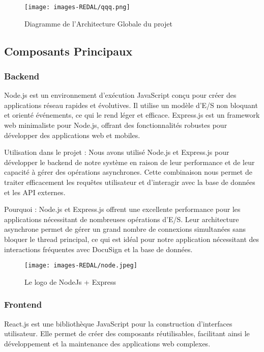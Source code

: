 \begin{figure}[H]
\begin{center}
\texttt{[image: images-REDAL/qqq.png]}
\end{center}
\caption{Diagramme de l'Architecture Globale du projet}
\end{figure}

\newpage
\subsection{Composants Principaux}
\subsubsection{Backend}
Node.js est un environnement d'exécution JavaScript conçu pour créer des applications réseau rapides et évolutives. Il utilise un modèle d'E/S non bloquant et orienté événements, ce qui le rend léger et efficace. Express.js est un framework web minimaliste pour Node.js, offrant des fonctionnalités robustes pour développer des applications web et mobiles.

Utilisation dans le projet : Nous avons utilisé Node.js et Express.js pour développer le backend de notre système en raison de leur performance et de leur capacité à gérer des opérations asynchrones. Cette combinaison nous permet de traiter efficacement les requêtes utilisateur et d'interagir avec la base de données et les API externes.

Pourquoi : Node.js et Express.js offrent une excellente performance pour les applications nécessitant de nombreuses opérations d'E/S. Leur architecture asynchrone permet de gérer un grand nombre de connexions simultanées sans bloquer le thread principal, ce qui est idéal pour notre application nécessitant des interactions fréquentes avec DocuSign et la base de données.

\begin{figure}[H]
\begin{center}
\texttt{[image: images-REDAL/node.jpeg]}
\end{center}
\caption{Le logo de NodeJs + Express}
\end{figure}


\subsubsection{Frontend}
React.js est une bibliothèque JavaScript pour la construction d'interfaces utilisateur. Elle permet de créer des composants réutilisables, facilitant ainsi le développement et la maintenance des applications web complexes.


